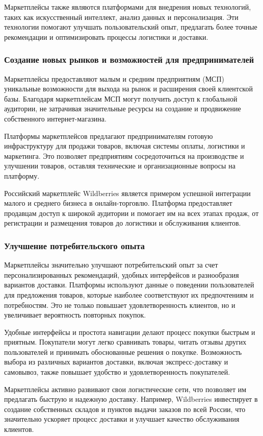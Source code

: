 Маркетплейсы также являются платформами для внедрения новых технологий, таких как искусственный интеллект, анализ данных и персонализация. Эти технологии помогают улучшать пользовательский опыт, предлагать более точные рекомендации и оптимизировать процессы логистики и доставки.

\subsubsection{Создание новых рынков и возможностей для предпринимателей}
Маркетплейсы предоставляют малым и средним предприятиям (МСП) уникальные возможности для выхода на рынок и расширения своей клиентской базы. Благодаря маркетплейсам МСП могут получить доступ к глобальной аудитории, не затрачивая значительные ресурсы на создание и продвижение собственного интернет-магазина.

Платформы маркетплейсов предлагают предпринимателям готовую инфраструктуру для продажи товаров, включая системы оплаты, логистики и маркетинга. Это позволяет предприятиям сосредоточиться на производстве и улучшении товаров, оставляя технические и организационные вопросы на платформу.

Российский маркетплейс Wildberries является примером успешной интеграции малого и среднего бизнеса в онлайн-торговлю. Платформа предоставляет продавцам доступ к широкой аудитории и помогает им на всех этапах продаж, от регистрации и размещения товаров до логистики и обслуживания клиентов.

\subsubsection{Улучшение потребительского опыта}
Маркетплейсы значительно улучшают потребительский опыт за счет персонализированных рекомендаций, удобных интерфейсов и разнообразия вариантов доставки. Платформы используют данные о поведении пользователей для предложения товаров, которые наиболее соответствуют их предпочтениям и потребностям. Это не только повышает удовлетворенность клиентов, но и увеличивает вероятность повторных покупок.

Удобные интерфейсы и простота навигации делают процесс покупки быстрым и приятным. Покупатели могут легко сравнивать товары, читать отзывы других пользователей и принимать обоснованные решения о покупке. Возможность выбора из различных вариантов доставки, включая экспресс-доставку и самовывоз, также повышает удобство и удовлетворенность покупателей.

Маркетплейсы активно развивают свои логистические сети, что позволяет им предлагать быструю и надежную доставку. Например, Wildberries инвестирует в создание собственных складов и пунктов выдачи заказов по всей России, что значительно ускоряет процесс доставки и улучшает качество обслуживания клиентов.

